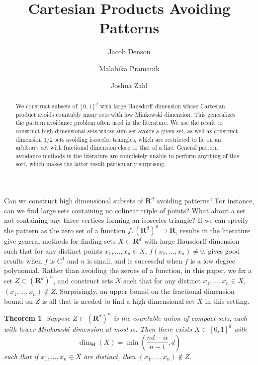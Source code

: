 \documentclass[dvipsnames]{article}
\title{Cartesian Products Avoiding Patterns}
\author{Jacob Denson\\ \and Malabika Pramanik\\ \and Joshua Zahl}
\theoremstyle{plain}
\theoremstyle{plain}
\newtheorem{theorem}{Theorem}
\begin{document}
\maketitle










\begin{abstract}
	We construct subsets of $[0,1]^d$ with large Hausdorff dimension whose Cartesian product avoids countably many sets with low Minkowski dimension. This generalizes the pattern avoidance problem often used in the literature. We use the result to construct high dimensional sets whose sum set avoids a given set, as well as construct dimension $1/2$ sets avoiding isosceles triangles, which are restricted to lie on an arbitrary set with fractional dimension close to that of a line. General pattern avoidance methods in the literature are completely unable to perform anything of this sort, which makes the latter result particularly surprising.
\end{abstract}










Can we construct high dimensional subsets of $\mathbf{R}^d$ avoiding patterns? For instance, can we find large sets containing no colinear triple of points? What about a set not containing any three vertices forming an isosceles triangle? If we can specify the pattern as the zero set of a function $f: (\mathbf{R}^d)^n \to \mathbf{R}$, results in the literature give general methods for finding sets $X \subset \mathbf{R}^d$ with large Hausdorff dimension such that for any distinct points $x_1, \dots, x_n \in X$, $f(x_1, \dots, x_n) \neq 0$. \cite{MalabikaRob} gives good results when $f$ is $C^1$ and $n$ is small, and \cite{Mathe} is successful when $f$ is a low degree polynomial. Rather than avoiding the zeroes of a function, in this paper, we fix a set $Z \subset (\mathbf{R}^d)^n$, and construct sets $X$ such that for any distinct $x_1, \dots, x_n \in X$, $(x_1, \dots, x_n) \not \in Z$. Surprisingly, an upper bound on the fractional dimension bound on $Z$ is all that is needed to find a high dimensional set $X$ in this setting.

\begin{theorem}
	Suppose $Z \subset (\mathbf{R}^d)^n$ is the countable union of compact sets, each with lower Minkowski dimension at most $\alpha$. Then there exists $X \subset [0,1]^d$ with
	\[ \dim_{\mathbf{H}}(X) = \min \left( \frac{nd - \alpha}{n-1}, d \right) \]
	such that if $x_1, \dots, x_n \in X$ are distinct, then $(x_1, \dots, x_n) \not \in Z$.
\end{theorem}
\end{document}
